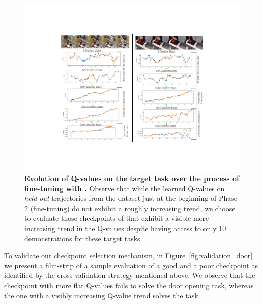 \begin{figure}[h]
\centering
  \includegraphics[width=0.97\linewidth]{chapters/ptr/Fig_rebuttal.pdf}
  \vspace{-0.1cm}
  \caption{\footnotesize \textbf{Evolution of Q-values on the target task over the process of fine-tuning with \ptrmethodname.} Observe that while the learned Q-values on \emph{held-out} trajectories from the dataset just at the beginning of Phase 2 (fine-tuning) do not exhibit a roughly increasing trend, we choose to evaluate those checkpoints of \ptrmethodname that exhibit a visible more increasing trend in the Q-values despite having access to only 10 demonstrations for these target tasks.}
  \label{fig:moreexreb}
  \vspace{-0.1cm}
\end{figure}

To validate our checkpoint selection mechanism, in Figure~\ref{fig:validation_door} we present a film-strip of a sample evaluation of a good and a poor checkpoint as identified by the cross-validation strategy mentioned above. We observe that the checkpoint with more flat Q-values fails to solve the door opening task, whereas the one with a visibly increasing Q-value trend solves the task.

